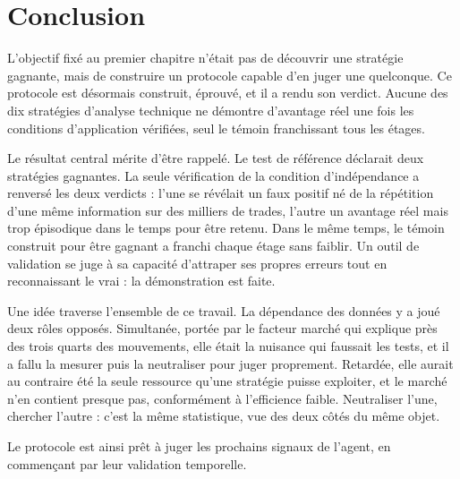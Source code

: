 \chapter{Conclusion}
\label{chap:conclusion}

L'objectif fixé au premier chapitre n'était pas de découvrir une stratégie
gagnante, mais de construire un protocole capable d'en juger une quelconque.
Ce protocole est désormais construit, éprouvé, et il a rendu son verdict.
Aucune des dix stratégies d'analyse technique ne démontre d'avantage réel une
fois les conditions d'application vérifiées, seul le témoin franchissant tous
les étages.

Le résultat central mérite d'être rappelé. Le test de référence déclarait deux
stratégies gagnantes. La seule vérification de la condition d'indépendance a
renversé les deux verdicts : l'une se révélait un faux positif né de la
répétition d'une même information sur des milliers de trades, l'autre un
avantage réel mais trop épisodique dans le temps pour être retenu. Dans le
même temps, le témoin construit pour être gagnant a franchi chaque étage sans
faiblir. Un outil de validation se juge à sa capacité d'attraper ses propres
erreurs tout en reconnaissant le vrai : la démonstration est faite.

Une idée traverse l'ensemble de ce travail. La dépendance des données y a joué
deux rôles opposés. Simultanée, portée par le facteur marché qui explique près
des trois quarts des mouvements, elle était la nuisance qui faussait les
tests, et il a fallu la mesurer puis la neutraliser pour juger proprement.
Retardée, elle aurait au contraire été la seule ressource qu'une stratégie
puisse exploiter, et le marché n'en contient presque pas, conformément à
l'efficience faible. Neutraliser l'une, chercher l'autre : c'est la même
statistique, vue des deux côtés du même objet.

Le protocole est ainsi prêt à juger les prochains signaux de l'agent, en
commençant par leur validation temporelle.
